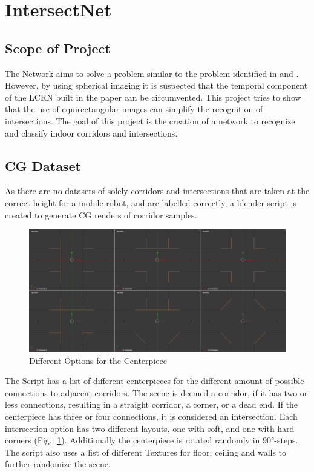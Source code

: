 \documentclass[sigconf, nonacm]{acmart}
\begin{document}
\section{IntersectNet}
\subsection{Scope of Project}
The Network aims to solve a problem similar to the problem identified in \cite{IntersectNet} and \citep{E2ENavigation}.
However, by using spherical imaging it is suspected that the temporal component of the LCRN built in the paper can be circumvented.
This project tries to show that the use of equirectangular images can simplify the recognition of intersections.
The goal of this project is the creation of a network to recognize and classify indoor corridors and intersections.

\subsection{CG Dataset}
As there are no datasets of solely corridors and intersections that are taken at the correct height for a mobile robot, and are labelled correctly, a blender script is created to generate CG renders of corridor samples.

\begin{figure}[h]
  \centering
  \includegraphics[width=\linewidth]{Blender_Schematic_Combined}
  \caption{Different Options for the Centerpiece}
  \label{fig:Centerpiece}
\end{figure}

The Script has a list of different centerpieces for the different amount of possible connections to adjacent corridors.
The scene is deemed a corridor, if it has two or less connections, resulting in a straight corridor, a corner, or a dead end.
If the centerpiece has three or four connections, it is considered an intersection.
Each intersection option has two different layouts, one with soft, and one with hard corners (Fig.: \ref{fig:Centerpiece}).
Additionally the centerpiece is rotated randomly in 90°-steps.
The script also uses a list of different Textures for floor, ceiling and walls to further randomize the scene.
\end{document}
